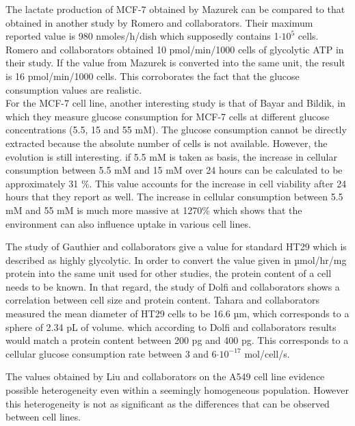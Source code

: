 \documentclass[11pt,a4paper]{article}
\begin{document}
The lactate production of MCF-7 obtained by Mazurek can be compared to that obtained in  another study by Romero and collaborators. Their maximum reported value is 980 nmoles/h/dish which supposedly contains 1$\cdot 10^{5}$ cells. Romero and collaborators obtained 10 pmol/min/1000 cells of glycolytic ATP in their study.\cite{RomeroAgilent} If the value from Mazurek is converted into the same unit, the result is 16 pmol/min/1000 cells. This corroborates the fact that the glucose consumption values are realistic.\\

For the MCF-7 cell line, another interesting study is that of Bayar and Bildik, in which they measure glucose consumption for MCF-7 cells at different glucose concentrations (5.5, 15 and 55 mM). The glucose consumption cannot be directly extracted because the absolute number of cells is not available. However, the evolution is still interesting. if 5.5 mM is taken as basis, the increase in cellular consumption between 5.5 mM and 15 mM over 24 hours can be calculated to be approximately 31 \%. This value accounts for the increase in cell viability after 24 hours that they report as well. The increase in cellular consumption between 5.5 mM and 55 mM is much more massive at 1270\% which shows that the environment can also influence uptake in various cell lines.\cite{Bayar2021}

The study of Gauthier and collaborators give a value for standard HT29 which is described as highly glycolytic. In order to convert the value given in µmol/hr/mg protein into the same unit used for other studies, the protein content of a cell needs to be known. In that regard, the study of Dolfi and collaborators shows a correlation between cell size and protein content.\cite{Dolfi2013} Tahara and collaborators measured the mean diameter of HT29 cells to be 16.6 µm, which corresponds to a sphere of 2.34 pL of volume.\cite{Tahara2013} which according to Dolfi and collaborators results would match a protein content between 200 pg and 400 pg. This corresponds to a cellular glucose consumption rate between 3 and 6$ \cdot 10^{-17}$ mol/cell/s.

The values obtained by Liu and collaborators on the A549 cell line evidence possible heterogeneity even within a seemingly homogeneous population. However this heterogeneity is not as significant as the differences that can be observed between cell lines.\cite{Liu2013}
 
\end{document}
